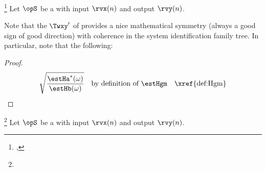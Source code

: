 \begin{definition}
\footnote{
  ,
  }
Let $\opS$ be a  with input $\rvx(n)$ and output $\rvy(n)$.
\end{definition}

\begin{remark}
\label{rem:HgmTxyCxy}
Note that the  $\Twxy'$ of 
provides a nice mathematical symmetry (always a good sign of good direction) with coherence 
in the system identification family tree.
In particular, note that the following:
\end{remark}
\begin{proof}
\begin{align*}
  \sqrt{\frac{\estHa^\ast(\omega)}{\estHb(\omega)}}
    && \text{by definition of $\estHgm$}
    && \text{\xref{def:Hgm}}
\end{align*}
\end{proof}



\begin{definition}
\footnote{
  }
\label{def:Hharm}
Let $\opS$ be a  with input $\rvx(n)$ and output $\rvy(n)$.
\end{definition}


